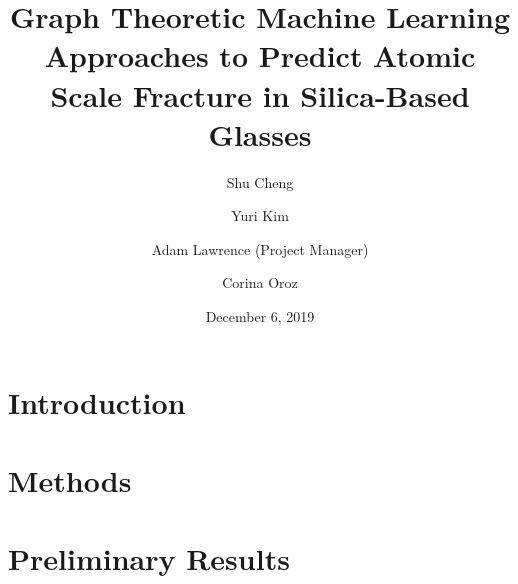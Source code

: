 \documentclass[midyear]{cguclinic}
\title{Graph Theoretic Machine Learning Approaches to Predict Atomic Scale Fracture in Silica-Based Glasses}
\author{Shu Cheng \and Yuri Kim \and Adam Lawrence (Project Manager) \and Corina Oroz}
\date{December 6, 2019}
\theoremstyle{definition}
\begin{document}
\frontmatter

\maketitle

\abstract


\tableofcontents

\mainmatter

\chapter{Introduction}
\label{sec: Introduction}


\chapter{Methods}
\label{sec: Methods}


\chapter{Preliminary Results}
\label{sec: Preliminary Results}




%







\small


\end{document}
